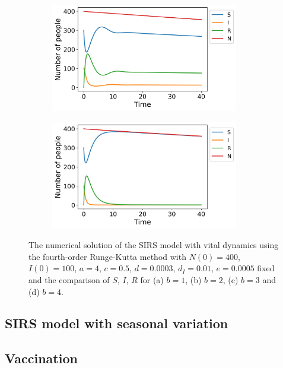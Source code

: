 \documentclass[../main.tex]{subfiles}
\begin{document}
\begin{figure}[htb!]
    \begin{subfigure}[b]{0.475\textwidth}
    \centering
    \includegraphics[width=0.9\textwidth]{../figures/SIRS_vital_rk4_b=3.png}
    \caption{}
    \label{fig:vital_b=3}
    \end{subfigure}
    \quad
    \begin{subfigure}[b]{0.475\textwidth}
    \includegraphics[width=0.9\textwidth]{../figures/SIRS_vital_rk4_b=4.png}
    \caption{}
    \label{fig:vital_b=4}
    \end{subfigure}
    \caption{The numerical solution of the SIRS model with vital dynamics using the fourth-order Runge-Kutta method with $N(0)=400$, $I(0)=100$, $a=4$, $c=0.5$, $d=0.0003$, $d_I=0.01$, $e=0.0005$ fixed and the comparison of $S$, $I$, $R$ for (a)  $b=1$, (b) $b=2$, (c) $b=3$ and (d) $b=4$.}
    \label{fig:SIRS_rk4_vital}
\end{figure}

\subsection{SIRS model with seasonal variation}

\subsection{Vaccination}
\end{document}
